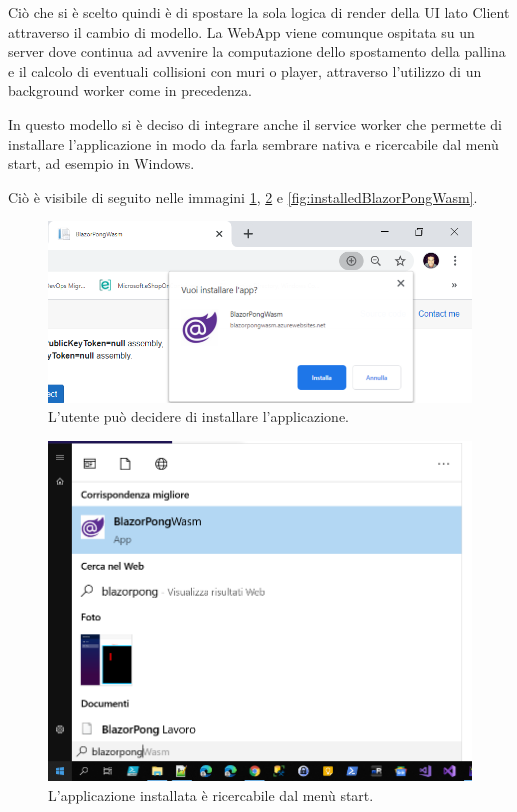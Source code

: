 Ci\`o che si \`e scelto quindi \`e di spostare la sola logica di render della UI lato Client attraverso il cambio di modello.
La WebApp viene comunque ospitata su un server dove continua ad avvenire la computazione dello spostamento della pallina e il calcolo di eventuali collisioni con muri o player, attraverso l'utilizzo di un background worker come in precedenza.

In questo modello si \`e deciso di integrare anche il service worker che permette di installare l'applicazione in modo da farla sembrare nativa e ricercabile dal men\`u start, ad esempio in Windows.

Ci\`o \`e visibile di seguito nelle immagini \ref{fig:installableBlazorPongWasm}, \ref{fig:searchingBlazorPongWasm} e \ref{fig:installedBlazorPongWasm}.
\begin{figure}[H]
	\centerline{\includegraphics[scale=0.6]{figure/installableBlazorPongWasm.png}}
	\caption{L'utente pu\`o decidere di installare l'applicazione.}
	\label{fig:installableBlazorPongWasm}
\end{figure}

\begin{figure}[H]
	\centerline{\includegraphics[scale=0.5]{figure/searchingBlazorPongWasm.png}}
	\caption{L'applicazione installata \`e ricercabile dal men\`u start.}
	\label{fig:searchingBlazorPongWasm}
\end{figure}

